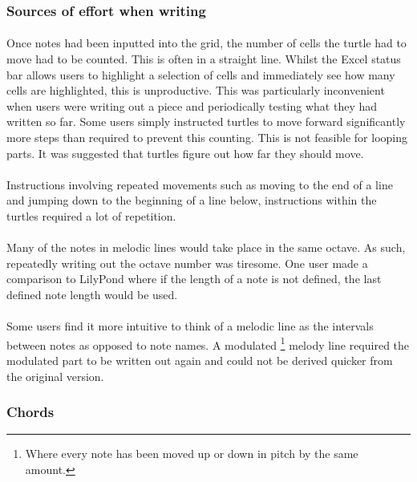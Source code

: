 \subsubsection{Sources of effort when writing}

\paragraph{} Once notes had been inputted into the grid, the number of cells the turtle had to move had to be counted. This is often in a straight line. Whilst the Excel status bar allows users to highlight a selection of cells and immediately see how many cells are highlighted, this is unproductive. This was particularly inconvenient when users were writing out a piece and periodically testing what they had written so far. Some users simply instructed turtles to move forward significantly more steps than required to prevent this counting. This is not feasible for looping parts. It was suggested that turtles figure out how far they should move.

\paragraph{} Instructions involving repeated movements such as moving to the end of a line and jumping down to the beginning of a line below, instructions within the turtles required a lot of repetition.

\paragraph{} Many of the notes in melodic lines would take place in the same octave. As such, repeatedly writing out the octave number was tiresome. One user made a comparison to LilyPond \cite{sandberg:lily} where if the length of a note is not defined, the last defined note length would be used.

\paragraph{} Some users find it more intuitive to think of a melodic line as the intervals between notes as opposed to note names. A modulated \footnote{Where every note has been moved up or down in pitch by the same amount.} melody line required the modulated part to be written out again and could not be derived quicker from the original version.

\subsubsection{Chords}

